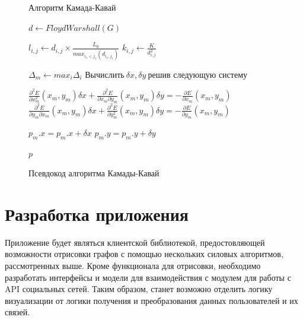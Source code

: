 \documentclass[14pt, russian]{scrartcl}
\begin{document}
\begin{figure}[H]
\centering
  \begin{minipage}[t]{.9\textwidth}
  \centering
\begin{algorithm}[H]
\caption{Алгоритм Камада-Кавай}
\begin{algorithmic}
  
  \State $d \gets FloydWarshall(G)$
  
	\State {}
        \State $l_{i,j} \gets d_{i, j} \times \frac{L_0}{max_{i_1 < j_1}(d_{i_1, j_1})} $ 
        \State $k_{i,j} \gets \frac{K}{d^{2}_{i, j}} $ 
       
      \EndIf
     
  
    \EndFor
  \EndFor

  \State {}
  
  \State $\Delta_m \gets max_i \Delta_i$
   \State $\text{Вычислить} \ \delta x, \delta y \ \text{решив следующую систему}$
  
   \State $ \frac{\partial^2 E}{\partial x^{2}_m}(x_m, y_m)\delta x + \frac{\partial^2 E}{\partial x_m \partial y_m}(x_m, y_m)\delta y = -\frac{\partial E}{\partial x_m}(x_m, y_m) $
   \State $ \frac{\partial^2 E}{\partial y_m \partial x_m}(x_m, y_m)\delta x + \frac{\partial^2 E}{\partial y^{2}_m}(x_m, y_m)\delta y = -\frac{\partial E}{\partial y_m}(x_m, y_m) $

   \State $p_m.x = p_m.x + \delta x$
   \State $p_m.y = p_m.y + \delta y$
  \EndWhile
  \EndWhile
  
	\State \Return $p$
	\EndFunction

\end{algorithmic}
\end{algorithm}

  \end{minipage}
\caption{Псевдокод алгоритма Камады-Кавай}
\label{fig:kk_alg}
\end{figure}





\section{Разработка приложения}


Приложение будет являться клиентской библиотекой,
 предостовляющей возможности отрисовки графов с помощью нескольких силовых алгоритмов, рассмотренных выше.
Кроме функционала для отрисовки, необходимо разработать интерфейсы и модели 
для взаимодействия с модулем для работы с API социальных сетей.
Таким образом, станет возможно отделить логику визуализации от логики получения и преобразования данных пользователей и их связей. 
\end{document}

